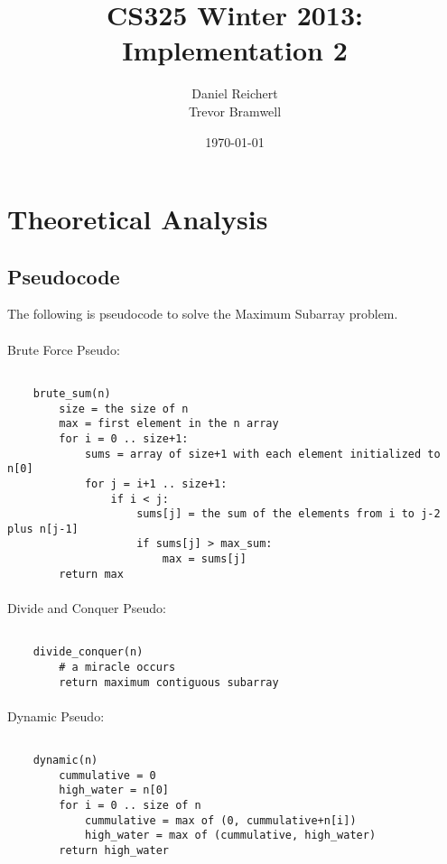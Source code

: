 \documentclass[12pt]{article}
\title{CS325 Winter 2013: Implementation 2}
\author{
    Daniel Reichert \\
    Trevor Bramwell
}
\date{\today}
\begin{document}
\maketitle

\section{Theoretical Analysis}
\subsection{Pseudocode}
    The following is pseudocode to solve the Maximum Subarray problem.
\paragraph{}
Brute Force Pseudo:
    \begin{lstlisting}[basicstyle=\ttfamily\small,mathescape]

    brute_sum(n)
        size = the size of n
        max = first element in the n array
        for i = 0 .. size+1:
            sums = array of size+1 with each element initialized to n[0]
            for j = i+1 .. size+1:
                if i < j:
                    sums[j] = the sum of the elements from i to j-2 plus n[j-1]
                    if sums[j] > max_sum:
                        max = sums[j]
        return max

    \end{lstlisting}


\paragraph{}
Divide and Conquer Pseudo:
    \begin{lstlisting}[basicstyle=\ttfamily\small,mathescape]

    divide_conquer(n)
        # a miracle occurs
        return maximum contiguous subarray

    \end{lstlisting}
        

\paragraph{}
Dynamic Pseudo:
    \begin{lstlisting}[basicstyle=\ttfamily\small,mathescape]

    dynamic(n)
        cummulative = 0
        high_water = n[0]
        for i = 0 .. size of n
            cummulative = max of (0, cummulative+n[i])
            high_water = max of (cummulative, high_water)
        return high_water

    \end{lstlisting}
\end{document}
